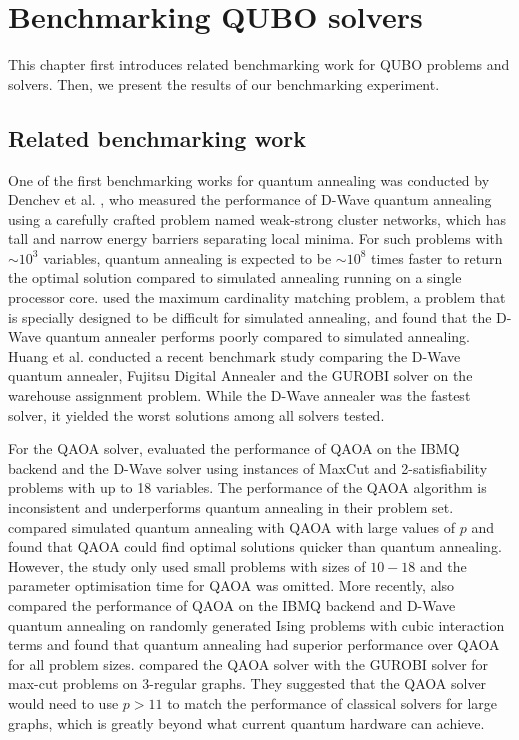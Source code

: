 \chapter{Benchmarking QUBO solvers}\label{benchmark}
This chapter first introduces related benchmarking work for QUBO problems and solvers. Then, we present the results of our benchmarking experiment.

\section{Related benchmarking work}
One of the first benchmarking works for quantum annealing was conducted by Denchev et al. , who measured the performance of D-Wave quantum annealing using a carefully crafted problem named weak-strong cluster networks, which has tall and narrow energy barriers separating local minima. For such problems with $\sim 10^3$ variables, quantum annealing is expected to be $\sim 10^8$ times faster to return the optimal solution compared to simulated annealing running on a single processor core.  used the maximum cardinality matching problem, a problem that is specially designed to be difficult for simulated annealing, and found that the D-Wave quantum annealer performs poorly compared to simulated annealing. Huang et al.  conducted a recent benchmark study comparing the D-Wave quantum annealer, Fujitsu Digital Annealer and the GUROBI solver on the warehouse assignment problem. While the D-Wave annealer was the fastest solver, it yielded the worst solutions among all solvers tested.

For the QAOA solver,  evaluated the performance of QAOA on the IBMQ backend and the D-Wave solver using instances of MaxCut and 2-satisfiability problems with up to 18 variables. The performance of the QAOA algorithm is inconsistent and underperforms quantum annealing in their problem set.  compared simulated quantum annealing with QAOA with large values of $p$ and found that QAOA could find optimal solutions quicker than quantum annealing. However, the study only used small problems with sizes of $10-18$ and the parameter optimisation time for QAOA was omitted. More recently,  also compared the performance of QAOA on the IBMQ backend and D-Wave quantum annealing on randomly generated Ising problems with cubic interaction terms and found that quantum annealing had superior performance over QAOA for all problem sizes.  compared the QAOA solver with the GUROBI solver for max-cut problems on 3-regular graphs. They suggested that the QAOA solver would need to use $p > 11$ to match the performance of classical solvers for large graphs, which is greatly beyond what current quantum hardware can achieve.

